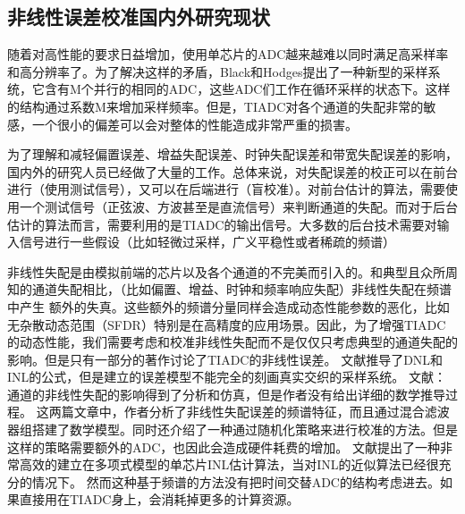 	
	\subsection {非线性误差校准国内外研究现状}
	随着对高性能的要求日益增加，使用单芯片的ADC越来越难以同时满足高采样率和高分辨率了。为了解决这样的矛盾，Black和Hodges提出了一种新型的采样系统，它含有M个并行的相同的ADC，这些ADC们工作在循环采样的状态下。这样的结构通过系数M来增加采样频率。但是，TIADC对各个通道的失配非常的敏感，一个很小的偏差可以会对整体的性能造成非常严重的损害。
	\par
	为了理解和减轻偏置误差、增益失配误差、时钟失配误差和带宽失配误差的影响，国内外的研究人员已经做了大量的工作。总体来说，对失配误差的校正可以在前台进行（使用测试信号），又可以在后端进行（盲校准）。对前台估计的算法，需要使用一个测试信号（正弦波、方波甚至是直流信号）来判断通道的失配。而对于后台估计的算法而言，需要利用的是TIADC的输出信号。大多数的后台技术需要对输入信号进行一些假设（比如轻微过采样，广义平稳性或者稀疏的频谱）\par
	非线性失配是由模拟前端的芯片以及各个通道的不完美而引入的。和典型且众所周知的通道失配相比，（比如偏置、增益、时钟和频率响应失配）非线性失配在频谱中产生 额外的失真。这些额外的频谱分量同样会造成动态性能参数的恶化，比如无杂散动态范围（SFDR）特别是在高精度的应用场景。因此，为了增强TIADC的动态性能，我们需要考虑和校准非线性失配而不是仅仅只考虑典型的通道失配的影响。但是只有一部分的著作讨论了TIADC的非线性误差。
	文献推导了DNL和INL的公式，但是建立的误差模型不能完全的刻画真实交织的采样系统。
	文献：通道的非线性失配的影响得到了分析和仿真，但是作者没有给出详细的数学推导过程。
	这两篇文章中，作者分析了非线性失配误差的频谱特征，而且通过混合滤波器组搭建了数学模型。同时还介绍了一种通过随机化策略来进行校准的方法。但是这样的策略需要额外的ADC，也因此会造成硬件耗费的增加。
	文献提出了一种非常高效的建立在多项式模型的单芯片INL估计算法，当对INL的近似算法已经很充分的情况下。	然而这种基于频谱的方法没有把时间交替ADC的结构考虑进去。如果直接用在TIADC身上，会消耗掉更多的计算资源。
	
